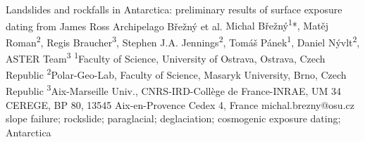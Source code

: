 \abstract
{Landslides and rockfalls in Antarctica: preliminary results of surface exposure dating from James Ross Archipelago} 
{Břežný et al.} 
{Michal Břežný\textsuperscript{1}*, Matěj Roman\textsuperscript{2}, Regis Braucher\textsuperscript{3}, Stephen J.A. Jennings\textsuperscript{2}, Tomáš Pánek\textsuperscript{1}, Daniel Nývlt\textsuperscript{2}, ASTER Team\textsuperscript{3}} 
{\TLtag} 
{
	\textsuperscript{1}Faculty of Science, University of Ostrava, Ostrava, Czech Republic
	\textsuperscript{2}Polar-Geo-Lab, Faculty of Science, Masaryk University, Brno, Czech Republic
	\textsuperscript{3}Aix-Marseille Univ., CNRS-IRD-Collège de France-INRAE, UM 34 CEREGE, BP 80, 13545 Aix-en-Provence Cedex 4, France
}
{michal.brezny@osu.cz}  %
{slope failure; rockslide; paraglacial; deglaciation; cosmogenic exposure dating; Antarctica}
